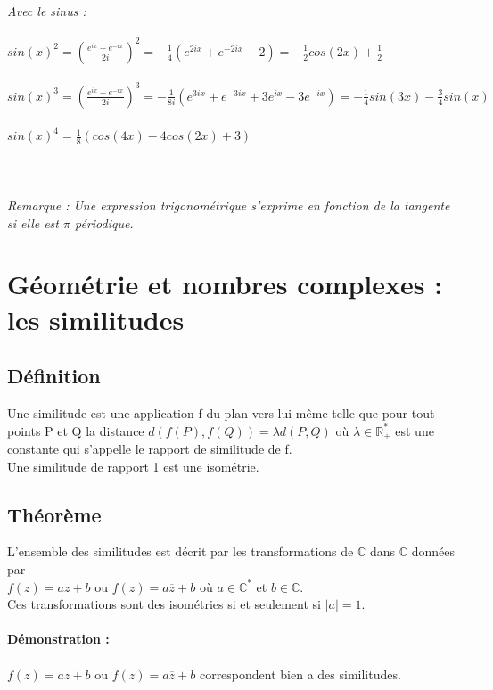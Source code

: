 \documentclass[a4paper,10pt]{book}
\newcommand{\Rpe}{\mathbb{R}_{+}^{*}}
\newcommand{\C}{\mathbb{C}}
\begin{document}
\textit{Avec le sinus :}\\\\
$sin(x)^{2}=(\frac{e^{ix}-e^{-ix}}{2i})^{2}=-\frac{1}{4}(e^{2ix}+e^{-2ix}-2)=-\frac{1}{2}cos(2x)+\frac{1}{2}$\\\\
$sin(x)^{3}=(\frac{e^{ix}-e^{-ix}}{2i})^{3}=-\frac{1}{8i}(e^{3ix}+e^{-3ix}+3e^{ix}-3e^{-ix})=-\frac{1}{4}sin(3x)-\frac{3}{4}sin(x)$\\\\
$sin(x)^{4}=\frac{1}{8}(cos(4x)-4cos(2x)+3)$\\\\\\\\



\textit{Remarque : Une expression trigonométrique s'exprime en fonction de la tangente si elle est $\pi$ périodique.}
\newpage

\section{Géométrie et nombres complexes : les similitudes}
\subsection{Définition}
Une similitude est une application f du plan vers lui-même telle que pour tout points P et Q la distance $d(f(P),f(Q))=\lambda d(P,Q)$ où $\lambda \in \Rpe$ est une constante qui s'appelle le rapport de similitude de f.\\

Une similitude de rapport 1 est une isométrie.

\subsection{Théorème}
L'ensemble des similitudes est décrit par les transformations de $\C$ dans $\C$ données par\\
$f(z)=az+b$ ou $f(z)=a\overline{z}+b$ où $a \in \C ^{*}$ et $b \in \C$.\\

Ces transformations sont des isométries si et seulement si $|a|=1$.\\\\

\textbf{Démonstration :}\\\\
$f(z)=az+b$ ou $f(z)=a\overline{z}+b$ correspondent bien a des similitudes.\\
\end{document}
